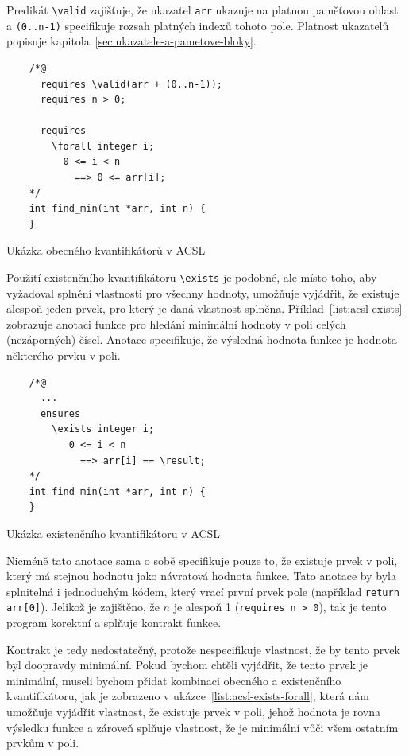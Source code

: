 Predikát \texttt{\textbackslash valid} zajišťuje,
že ukazatel \texttt{arr} ukazuje na platnou paměťovou oblast
a \texttt{(0..n-1)} specifikuje rozsah platných indexů tohoto pole.
Platnost ukazatelů popisuje kapitola~\ref{sec:ukazatele-a-pametove-bloky}.

\begin{listing}[H]
    \begin{verbatim}
    /*@
      requires \valid(arr + (0..n-1));
      requires n > 0;

      requires
        \forall integer i;
          0 <= i < n
            ==> 0 <= arr[i];
    */
    int find_min(int *arr, int n) {
    }
    \end{verbatim}
    \caption{Ukázka obecného kvantifikátorů v ACSL}
    \label{list:acsl-forall}
\end{listing}


Použití existenčního kvantifikátoru \texttt{\textbackslash exists} je podobné,
ale místo toho, aby vyžadoval splnění vlastnosti pro všechny hodnoty,
umožňuje vyjádřit, že existuje alespoň jeden prvek, pro který je daná vlastnost splněna.
Příklad~\ref{list:acsl-exists} zobrazuje anotaci funkce pro hledání minimální hodnoty v poli celých (nezáporných) čísel.
Anotace specifikuje, že výsledná hodnota funkce je hodnota některého prvku v poli.

\begin{listing}[H]
    \begin{verbatim}
    /*@
      ...
      ensures
        \exists integer i;
           0 <= i < n
             ==> arr[i] == \result;
    */
    int find_min(int *arr, int n) {
    }
    \end{verbatim}
    \caption{Ukázka existenčního kvantifikátoru v ACSL}
    \label{list:acsl-exists}
\end{listing}

Nicméně tato anotace sama o sobě specifikuje pouze to, že existuje prvek v poli,
který má stejnou hodnotu jako návratová hodnota funkce.
Tato anotace by byla splnitelná i jednoduchým kódem, který vrací první prvek pole (například \texttt{return arr[0]}).
Jelikož je zajištěno, že $n$ je alespoň 1 (\texttt{requires n > 0}),
tak je tento program korektní a splňuje kontrakt funkce.



Kontrakt je tedy nedostatečný, protože nespecifikuje vlastnost,
že by tento prvek byl doopravdy minimální.
Pokud bychom chtěli vyjádřit, že tento prvek je minimální,
museli bychom přidat kombinaci obecného a existenčního kvantifikátoru,
jak je zobrazeno v ukázce~\ref{list:acsl-exists-forall},
která nám umožňuje vyjádřit vlastnost, že existuje prvek v poli,
jehož hodnota je rovna výsledku funkce a zároveň splňuje vlastnost,
že je minimální vůči všem ostatním prvkům v poli.

